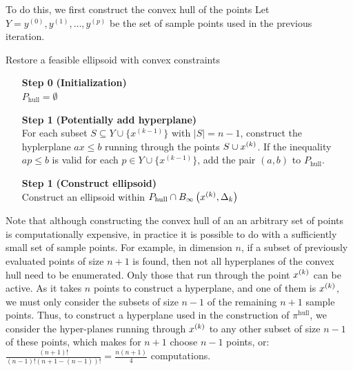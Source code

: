 

To do this, we first construct the convex hull of the points 
Let $Y = y^{(0)}, y^{(1)}, \ldots, y^{(p)}$ be the set of sample points used in the previous iteration.

\begin{algorithm}[H]
    \caption{Restore a feasible ellipsoid with convex constraints}
    \label{restore_feasible_ellipsoid_convex}
    \begin{itemize}
        \item[\textbf{Step 0}] \textbf{(Initialization)} \\
            $P_{\textrm{hull}} = \emptyset$
            
        \item[\textbf{Step 1}] \textbf{(Potentially add hyperplane)} \\
	    For each subset $S \subseteq Y \cup \{x^{(k-1)}\}$ with $|S| = n - 1$, construct the hyplerplane $ax\le b$ running through the points $S \cup x^{(k)}$.
	    If the inequality $ap \le b$ is valid for each $p \in Y \cup \{x^{(k-1)}\}$, add the pair $(a, b)$ to $P_{\textrm{hull}}$.
	
	\item[\textbf{Step 1}] \textbf{(Construct ellipsoid)} \\
	   Construct an ellipsoid within $P_{\textrm{hull}} \cap { B_{\infty}\left(x^{(k)}, \Delta_k\right) }$ \\
    \end{itemize}
\end{algorithm}


Note that although constructing the convex hull of an an arbitrary set of points is computationally expensive,
in practice it is possible to do with a sufficiently small set of sample points.
For example, in dimension $n$, if a subset of previously evaluated points of size $n+1$ is found, then not all hyperplanes of the convex hull need to be enumerated.
Only those that run through the point $x^{(k)}$ can be active.
As it takes $n$ points to construct a hyperplane, and one of them is $x^{(k)}$, we must only consider the subsets of size $n-1$ of the remaining $n+1$ sample points.
Thus, to construct a hyperplane used in the construction of $\pi^{\textrm{hull}}$,
we consider the hyper-planes running through $x^{(k)}$ to any other subset of size $n - 1$ of these points,
which makes for $n+1$ choose $n-1$ points, or:
$
\frac{(n+1)!}{(n-1)!(n+1 - (n-1))!} = \frac{n(n+1) }{4}
$
computations.

